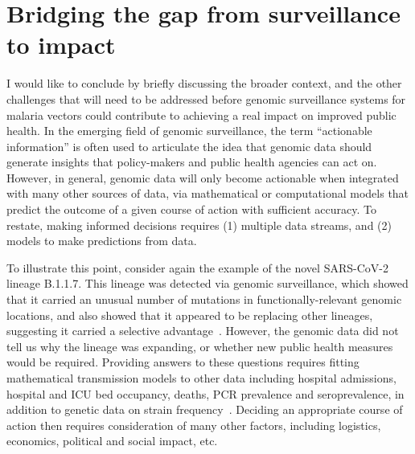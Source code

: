 \documentclass[a4paper,11pt,abstracton,hidelinks]{scrartcl}
\begin{document}
\section{Bridging the gap from surveillance to impact}\label{sec:external}


I would like to conclude by briefly discussing the broader context, and the other challenges that will need to be addressed before genomic surveillance systems for malaria vectors could contribute to achieving a real impact on improved public health.
%
In the emerging field of genomic surveillance, the term ``actionable information'' is often used to articulate the idea that genomic data should generate insights that policy-makers and public health agencies can act on.
%
However, in general, genomic data will only become actionable when integrated with many other sources of data, via mathematical or computational models that predict the outcome of a given course of action with sufficient accuracy.
%
To restate, making informed decisions requires (1) multiple data streams, and (2) models to make predictions from data.
%


To illustrate this point, consider again the example of the novel SARS-CoV-2 lineage B.1.1.7.
%
This lineage was detected via genomic surveillance, which showed that it carried an unusual number of mutations in functionally-relevant genomic locations, and also showed that it appeared to be replacing other lineages, suggesting it carried a selective advantage~\parencite{Rambaut2020}.
%
However, the genomic data did not tell us why the lineage was expanding, or whether new public health measures would be required.
%
Providing answers to these questions requires fitting mathematical transmission models to other data including hospital admissions, hospital and ICU bed occupancy, deaths, PCR prevalence and seroprevalence, in addition to genetic data on strain frequency~\parencite{Davies2020}.
%
Deciding an appropriate course of action then requires consideration of many other factors, including logistics, economics, political and social impact, etc.
\end{document}
